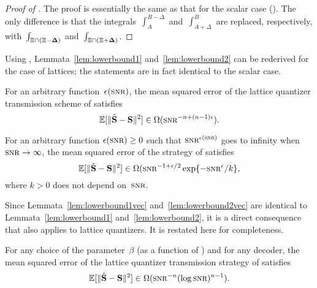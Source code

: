 \begin{proof}[Proof of ]
  The proof is essentially the same as that for the scalar case
  (). The only difference is that the
  integrals~$\int_A^{B-\Delta}$ and~$\int_{A+\Delta}^B$ are replaced,
  respectively, with~$\int_{\Xi \cap (\Xi - \mathbf{\Delta})}$ and~$\int_{\Xi \cap (\Xi +
  \mathbf{\Delta})}$.
\end{proof}

Using , Lemmata~\ref{lem:lowerbound1}
and~\ref{lem:lowerbound2} can be rederived for the case of lattices; the
statements are in fact identical to the scalar case.

\begin{lemma}
  \label{lem:lowerbound1vec}
  For an arbitrary function~$\e(\snr)$, the mean squared error of the lattice
  quantizer transmission scheme of  satisfies
  \begin{equation*}
    \msev \in \Omega(\snr^{-n + (n-1)\e}).
  \end{equation*}
\end{lemma}

\begin{lemma}
  \label{lem:lowerbound2vec}
  For an arbitrary function $\e(\snr) \ge 0$ such that 
  $\snr^{\e(\snr)}$ goes to infinity when $\snr \goesto \infty$, the mean
  squared error of the strategy of  satisfies
  \begin{equation*}
    \msev \in \Omega(\snr^{-1 + \e/2} \exp\{- \snr^\e/k \},
  \end{equation*}
  where $k > 0$ does not depend on~$\snr$.
\end{lemma}

Since Lemmata~\ref{lem:lowerbound1vec} and~\ref{lem:lowerbound2vec} are
identical to Lemmata~\ref{lem:lowerbound1} and~\ref{lem:lowerbound2}, it is a
direct consequence that  also applies to lattice quantizers.
It is restated here for completeness.

\begin{theorem}
  \label{thm:scalinglbvec}
  For any choice of the parameter~$\beta$ (as a function of \snr) and for any
  decoder, the mean squared error of the lattice quantizer transmission strategy
  of  satisfies
  \begin{equation*}
    \msev \in \Omega(\snr^{-n} (\log\snr)^{n-1}).
  \end{equation*}
\end{theorem}

